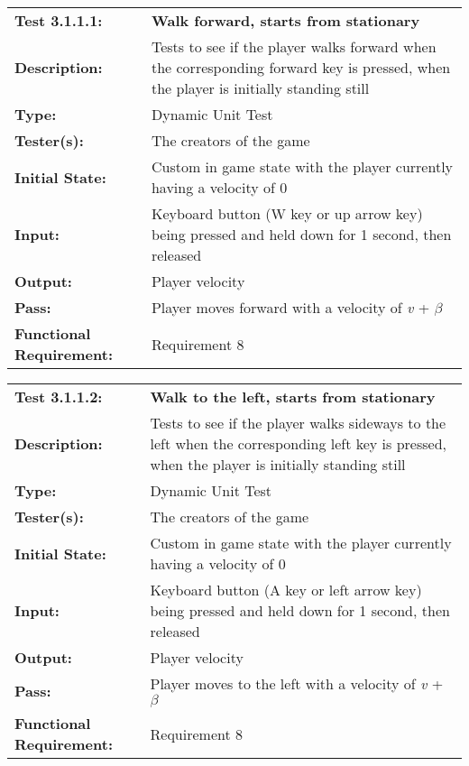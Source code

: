 \documentclass[12pt, titlepage]{article}
\begin{document}
\begin{mdframed}[linewidth=1pt]
\begin{tabularx}{\textwidth}{@{}p{3cm}X@{}}
{\bf Test 3.1.1.1:} & {\bf Walk forward, starts from stationary}\\[\baselineskip]
{\bf Description:} & Tests to see if the player walks forward when the corresponding forward key is pressed, when the player is initially standing still\\[0.5\baselineskip]
{\bf Type:} & Dynamic Unit Test\\[0.5\baselineskip]
{\bf Tester(s):} & The creators of the game\\[0.5\baselineskip]
{\bf Initial State:} & Custom in game state with the player currently having a velocity of 0\\[0.5\baselineskip]
{\bf Input:} & Keyboard button (W key or up arrow key) being pressed and held down for 1 second, then released\\[0.5\baselineskip]
{\bf Output:} & Player velocity\\[0.5\baselineskip]
{\bf Pass:} & Player moves forward with a velocity of \textit{v} + $\beta$ \\[0.5\baselineskip]
{\bf Functional Requirement:} & Requirement 8
\end{tabularx}
\end{mdframed}
					
\begin{mdframed}[linewidth=1pt]
\begin{tabularx}{\textwidth}{@{}p{3cm}X@{}}
{\bf Test 3.1.1.2:} & {\bf Walk to the left, starts from stationary}\\[\baselineskip]
{\bf Description:} & Tests to see if the player walks sideways to the left when the corresponding left key is pressed, when the player is initially standing still\\[0.5\baselineskip]
{\bf Type:} & Dynamic Unit Test\\[0.5\baselineskip]
{\bf Tester(s):} & The creators of the game\\[0.5\baselineskip]
{\bf Initial State:} & Custom in game state with the player currently having a velocity of 0\\[0.5\baselineskip]
{\bf Input:} & Keyboard button (A key or left arrow key) being pressed and held down for 1 second, then released\\[0.5\baselineskip]
{\bf Output:} & Player velocity\\[0.5\baselineskip]
{\bf Pass:} & Player moves to the left with a velocity of \textit{v} + $\beta$ \\[0.5\baselineskip]
{\bf Functional Requirement:} & Requirement 8
\end{tabularx}
\end{mdframed}
\end{document}
